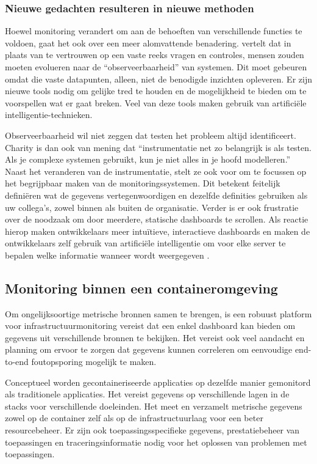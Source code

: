 \subsubsection{Nieuwe gedachten resulteren in nieuwe methoden}

Hoewel monitoring verandert om aan de behoeften van verschillende functies te voldoen, gaat het ook over een meer alomvattende benadering. \textcite{Charity2016} vertelt dat in plaats van te vertrouwen op een vaste reeks vragen en controles, mensen zouden moeten evolueren naar de “observeerbaarheid” van systemen. Dit moet gebeuren omdat die vaste datapunten, alleen, niet de benodigde inzichten opleveren. Er zijn nieuwe tools nodig om gelijke tred te houden en de mogelijkheid te bieden om te voorspellen wat er gaat breken. Veel van deze tools maken gebruik van artificiële intelligentie-technieken. 

Observeerbaarheid wil niet zeggen dat testen het probleem altijd identificeert. Charity is dan ook van mening dat “instrumentatie net zo belangrijk is als testen. Als je complexe systemen gebruikt, kun je niet alles in je hoofd modelleren.” Naast het veranderen van de instrumentatie, stelt ze ook voor om te focussen op het begrijpbaar maken van de monitoringssystemen. Dit betekent feitelijk definiëren wat de gegevens vertegenwoordigen en dezelfde definities gebruiken als uw collega's, zowel binnen als buiten de organisatie. Verder is er ook frustratie over de noodzaak om door meerdere, statische dashboards te scrollen. Als reactie hierop maken ontwikkelaars meer intuïtieve, interactieve dashboards en maken de ontwikkelaars zelf gebruik van artificiële intelligentie om voor elke server te bepalen welke informatie wanneer wordt weergegeven \autocite{Williams2016}.

\subsection{Monitoring binnen een containeromgeving}

Om ongelijksoortige metrische bronnen samen te brengen, is een robuust platform voor infrastructuurmonitoring vereist dat een enkel dashboard kan bieden om gegevens uit verschillende bronnen te bekijken. Het vereist ook veel aandacht en planning om ervoor te zorgen dat gegevens kunnen correleren om eenvoudige end-to-end foutopsporing mogelijk te maken.

Conceptueel worden gecontaineriseerde applicaties op dezelfde manier gemonitord als traditionele applicaties. Het vereist gegevens op verschillende lagen in de stacks voor verschillende doeleinden. Het meet en verzamelt metrische gegevens zowel op de container zelf als op de infrastructuurlaag voor een beter resourcebeheer. Er zijn ook toepassingsspecifieke gegevens, prestatiebeheer van toepassingen en traceringsinformatie nodig voor het oplossen van problemen met toepassingen.

